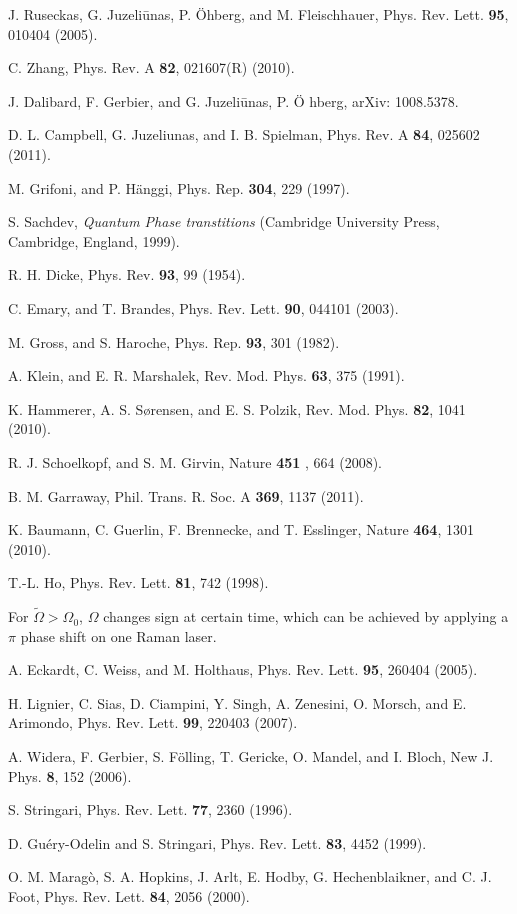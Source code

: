 \documentclass[prl,twocolumn,superscriptaddress,showpacs,floatfix]{revtex4}
\begin{document}
\begin{thebibliography}{99}
 J. Ruseckas, G. Juzeli\={u}nas, P. \"{O}hberg, and M.
Fleischhauer, Phys. Rev. Lett. \textbf{95}, 010404 (2005).

 C. Zhang, Phys. Rev. A \textbf{82}, 021607(R) (2010).

 J. Dalibard, F. Gerbier, and G. Juzeli\={u}nas, P. \"{O}%
hberg, arXiv: 1008.5378.

 D. L. Campbell, G. Juzeliunas, and I. B. Spielman, Phys.
Rev. A \textbf{84}, 025602 (2011).

 M. Grifoni, and P. H\"{a}nggi, Phys. Rep. \textbf{304},
229 (1997).

 S. Sachdev, \textit{Quantum Phase transtitions} (Cambridge
University Press, Cambridge, England, 1999).

 R. H. Dicke, Phys. Rev. \textbf{93}, 99 (1954).

 C. Emary, and T. Brandes, Phys. Rev. Lett. \textbf{90},
044101 (2003).

 M. Gross, and S. Haroche, Phys. Rep. \textbf{93}, 301 (1982).

 A. Klein, and E. R. Marshalek, Rev. Mod. Phys. \textbf{63},
375 (1991).

 K. Hammerer, A. S. S\o rensen, and E. S. Polzik, Rev. Mod.
Phys. \textbf{82}, 1041 (2010).

 R. J. Schoelkopf, and S. M. Girvin, Nature \textbf{451}%
, 664 (2008).

 B. M. Garraway, Phil. Trans. R. Soc. A \textbf{369}, 1137
(2011).

 K. Baumann, C. Guerlin, F. Brennecke, and T. Esslinger,
Nature \textbf{464}, 1301 (2010).

 T.-L. Ho, Phys. Rev. Lett. \textbf{81}, 742 (1998).

 For $\widetilde{\Omega }>\Omega _{0}$, $\Omega $ changes sign
at certain time, which can be achieved by applying a $\pi $ phase shift on
one Raman laser.

 A. Eckardt, C. Weiss, and M. Holthaus, Phys. Rev. Lett.
\textbf{95}, 260404 (2005).

 H. Lignier, C. Sias, D. Ciampini, Y. Singh, A. Zenesini,
O. Morsch, and E. Arimondo, Phys. Rev. Lett. \textbf{99}, 220403 (2007).

 A. Widera, F. Gerbier, S. F\"{o}lling, T. Gericke, O.
Mandel, and I. Bloch, New J. Phys. \textbf{8}, 152 (2006).

 S. Stringari, Phys. Rev. Lett. \textbf{77}, 2360 (1996).

 D. Gu\'{e}ry-Odelin and S. Stringari, Phys. Rev. Lett.
\textbf{83}, 4452 (1999).

 O. M. Marag\`{o}, S. A. Hopkins, J. Arlt, E. Hodby, G.
Hechenblaikner, and C. J. Foot, Phys. Rev. Lett. \textbf{84}, 2056 (2000).
\end{thebibliography}
\end{document}
